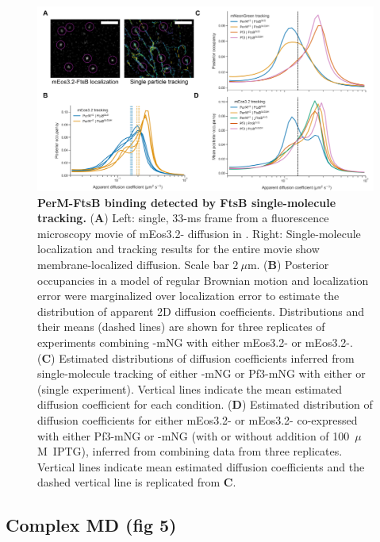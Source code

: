\documentclass[pdflatex,sn-basic]{sn-jnl}%
\begin{document}
\begin{figure}[h]
\centering
\includegraphics[width=1.0\textwidth]{../figures/fig4.png}
\caption{\textbf{PerM-FtsB binding detected by FtsB single-molecule tracking.} (\textbf{A}) Left: single, 33-ms frame from a fluorescence microscopy movie of mEos3.2-\ftsbdLQ{} diffusion in \ec{}. Right: Single-molecule localization and tracking results for the entire movie show membrane-localized diffusion. Scale bar $2~\mu$m. (\textbf{B}) Posterior occupancies in a model of regular Brownian motion and localization error were marginalized over localization error to estimate the distribution of apparent 2D diffusion coefficients. Distributions and their means (dashed lines) are shown for three replicates of experiments combining \permN{}-mNG with either mEos3.2-\ftsbdLQ{} or mEos3.2-\ftsbdLQdH{}. (\textbf{C}) Estimated distributions of diffusion coefficients inferred from single-molecule tracking of either \permN{}-mNG or Pf3-mNG with either \ftsbdLQ{} or \ftsbdLQdH{} (single experiment). Vertical lines indicate the mean estimated diffusion coefficient for each condition. (\textbf{D}) Estimated distribution of diffusion coefficients for either mEos3.2-\ftsbdLQ{} or mEos3.2-\ftsbdLQdH{} co-expressed with either Pf3-mNG or \permN{}-mNG (with or without addition of 100~$\mu$M~IPTG), inferred from combining data from three replicates. Vertical lines indicate mean estimated diffusion coefficients and the dashed vertical line is replicated from \textbf{C}.}\label{fig4}
\end{figure}

\subsection{Complex MD (fig 5)}

\loremipsum{}
\end{document}
